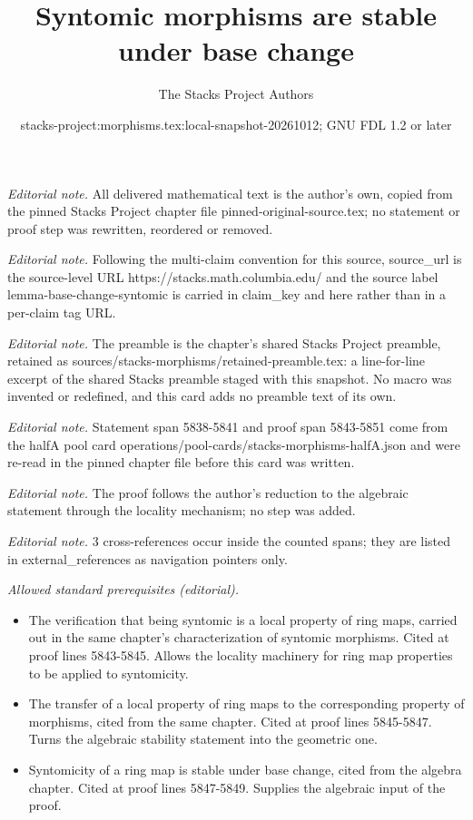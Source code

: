 \documentclass[10pt,a4paper]{amsart}
\title{Syntomic morphisms are stable under base change}
\author{The Stacks Project Authors}
\date{stacks-project:morphisms.tex:local-snapshot-20261012; GNU FDL 1.2 or later}
\theoremstyle{plain}
\theoremstyle{definition}
\theoremstyle{remark}
\numberwithin{equation}{subsection}
\begin{document}
\maketitle
\noindent\textit{Editorial note.} All delivered mathematical text is the author's own, copied from the pinned Stacks Project chapter file pinned-original-source.tex; no statement or proof step was rewritten, reordered or removed.\par\medskip
\noindent\textit{Editorial note.} Following the multi-claim convention for this source, source\_url is the source-level URL https://stacks.math.columbia.edu/ and the source label lemma-base-change-syntomic is carried in claim\_key and here rather than in a per-claim tag URL.\par\medskip
\noindent\textit{Editorial note.} The preamble is the chapter's shared Stacks Project preamble, retained as sources/stacks-morphisms/retained-preamble.tex: a line-for-line excerpt of the shared Stacks preamble staged with this snapshot. No macro was invented or redefined, and this card adds no preamble text of its own.\par\medskip
\noindent\textit{Editorial note.} Statement span 5838-5841 and proof span 5843-5851 come from the halfA pool card operations/pool-cards/stacks-morphisms-halfA.json and were re-read in the pinned chapter file before this card was written.\par\medskip
\noindent\textit{Editorial note.} The proof follows the author's reduction to the algebraic statement through the locality mechanism; no step was added.\par\medskip
\noindent\textit{Editorial note.} 3 cross-references occur inside the counted spans; they are listed in external\_references as navigation pointers only.\par\medskip
\noindent\textit{Allowed standard prerequisites (editorial).}\begin{itemize}
\item The verification that being syntomic is a local property of ring maps, carried out in the same chapter's characterization of syntomic morphisms. Cited at proof lines 5843-5845. Allows the locality machinery for ring map properties to be applied to syntomicity.
\item The transfer of a local property of ring maps to the corresponding property of morphisms, cited from the same chapter. Cited at proof lines 5845-5847. Turns the algebraic stability statement into the geometric one.
\item Syntomicity of a ring map is stable under base change, cited from the algebra chapter. Cited at proof lines 5847-5849. Supplies the algebraic input of the proof.
\end{itemize}\medskip
\end{document}
